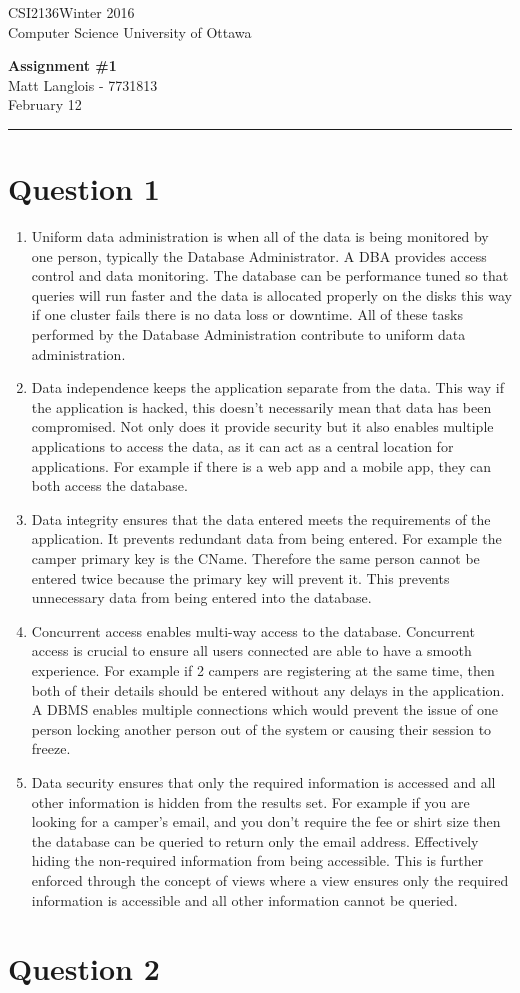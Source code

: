 \documentclass[fleqn, 12pt]{article}
\newcommand{\name}{Matt Langlois}
\newcommand{\studentNumber}{7731813}
\newcommand{\semester}{Winter 2016}
\newcommand{\assignemntNumber}{1}
\newcommand{\dueDate}{February 12}
\newcommand{\courseCode}{CSI2136}
\newcommand{\makeheader}{
    \noindent
    \courseCode \hfill \semester\\
    Computer Science \hfill University of Ottawa
    \begin{center}
        \textbf{Assignment \#\assignemntNumber}\\
        \name \hspace{1pt} - \studentNumber\\
        \dueDate\\ 
    \end{center}
    \vspace{6pt}
    \hrule
    \vspace{6pt}
}
\begin{document}
\thispagestyle{firstpage}
\makeheader

\section*{Question 1}

\begin{enumerate}[1.]
    \item
        Uniform data administration is when all of the data is being monitored by one person, typically the Database Administrator. A DBA provides access control and data monitoring. The database can be performance tuned so that queries will run faster and the data is allocated properly on the disks this way if one cluster fails there is no data loss or downtime. All of these tasks performed by the Database Administration contribute to uniform data administration.
    \item 
        Data independence keeps the application separate from the data. This way if the application is hacked, this doesn't necessarily mean that data has been compromised. Not only does it provide security but it also enables multiple applications to access the data, as it can act as a central location for applications. For example if there is a web app and a mobile app, they can both access the database.
    \item
        Data integrity ensures that the data entered meets the requirements of the application. It prevents redundant data from being entered. For example the camper primary key is the CName. Therefore the same person cannot be entered twice because the primary key will prevent it. This prevents unnecessary data from being entered into the database.
    \item
        Concurrent access enables multi-way access to the database. Concurrent access is crucial to ensure all users connected are able to have a smooth experience. For example if 2 campers are registering at the same time, then both of their details should be entered without any delays in the application. A DBMS enables multiple connections which would prevent the issue of one person locking another person out of the system or causing their session to freeze.
    \item
        Data security ensures that only the required information is accessed and all other information is hidden from the results set. For example if you are looking for a camper's email, and you don't require the fee or shirt size then the database can be queried to return only the email address. Effectively hiding the non-required information from being accessible. This is further enforced through the concept of views where a view ensures only the required information is accessible and all other information cannot be queried.
\end{enumerate}

\section*{Question 2}

\end{document}
